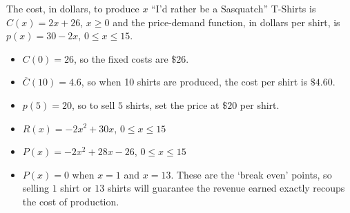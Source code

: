 {The cost, in dollars, to produce $x$ ``I'd rather be a Sasquatch'' T-Shirts is $C(x) = 2x+26$, $x \geq 0$ and the price-demand function, in dollars per shirt,  is $p(x) = 30 - 2x$, $0 \leq x \leq 15$. }
{\begin{itemize}

\item  $C(0) = 26$, so the fixed costs are $\$26$.

\item  $\overline{C}(10) = 4.6$, so when 10 shirts are produced, the cost per shirt is $\$4.60$.

\item  $p(5) = 20$, so to sell $5$ shirts, set the price at $\$20$ per shirt.

\item $R(x) = -2x^2+30x$, $0 \leq x \leq 15$

\item  $P(x) = -2x^2+28x-26$, $0 \leq x \leq 15$

\item  $P(x) = 0$ when $x = 1$ and $x=13$.  These are the `break even' points, so selling $1$ shirt or $13$ shirts will guarantee the revenue earned exactly recoups the cost of production.

\end{itemize}
}